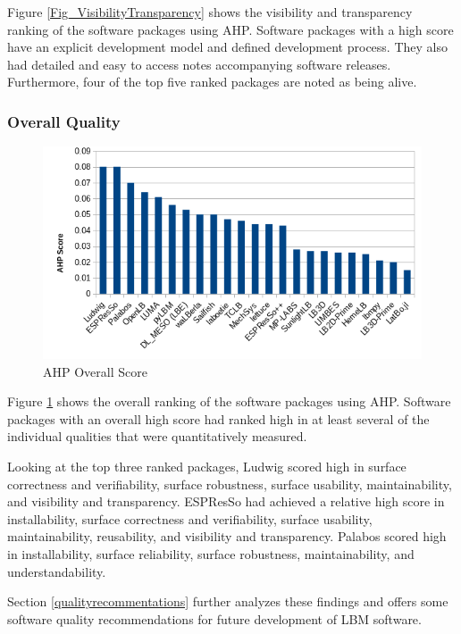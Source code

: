 \documentclass[12pt, notitlepage]{article}
\begin{document}
Figure \ref{Fig_VisibilityTransparency} shows the visibility and transparency ranking of the software packages using AHP. Software packages with a high score have an explicit development model and defined development process. They also 
had detailed and easy to access notes accompanying software releases. Furthermore, four of the top five ranked packages are noted as being alive.

\subsubsection{Overall Quality}

\begin{figure}[h!]
	\begin{center}
		\includegraphics[width=1.0\textwidth]{finalscore_chart}
		\caption{AHP Overall Score}
		\label{Fig_OverallScore}
	\end{center}
\end{figure}

Figure \ref{Fig_OverallScore} shows the overall ranking of the software packages using AHP. Software packages with an overall high score had ranked high in at least several of the individual qualities that were quantitatively measured.

Looking at the top three ranked packages, Ludwig scored high in surface correctness and verifiability, surface robustness, surface usability, maintainability, and visibility and transparency. ESPResSo had achieved a relative high score in installability, surface correctness and verifiability, surface usability, maintainability, reusability, and visibility and transparency. Palabos scored high in installability, surface reliability, surface robustness, maintainability, and understandability. 

Section \ref{qualityrecommentations} further analyzes these findings and offers some software quality recommendations for future development of LBM software.
\end{document}
